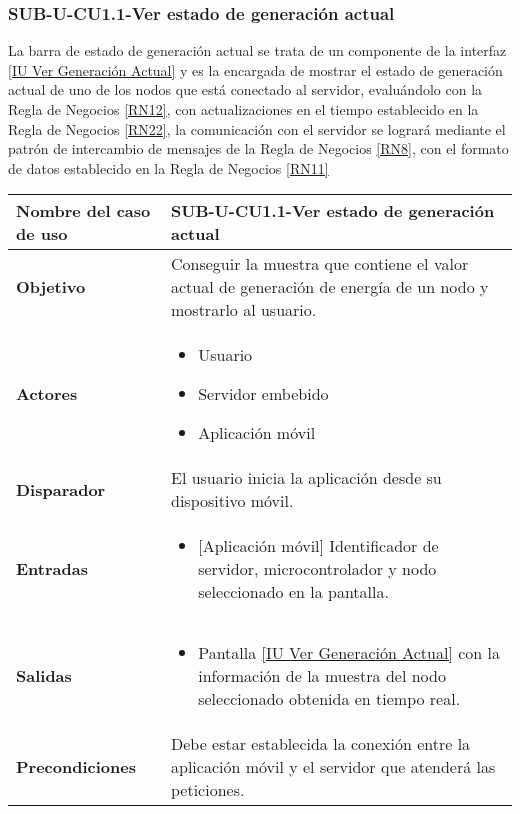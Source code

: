 \subsubsection{SUB-U-CU1.1-Ver estado de generación actual}\label{SUB-U-CU1.1}
La barra de estado de generación actual se trata de un componente de la interfaz \hyperref[fig:monitoreoReal]{[IU Ver Generación Actual]} y es la encargada de mostrar el estado de generación actual de uno de los nodos que está conectado al servidor, evaluándolo con la Regla de Negocios \ref{RN12}, con actualizaciones en el tiempo establecido en la Regla de Negocios \ref{RN22}, la comunicación con el servidor se logrará mediante el patrón de intercambio de mensajes de la Regla de Negocios \ref{RN8}, con el formato de datos establecido en la Regla de Negocios \ref{RN11}   
\begin{longtable}{|J{5cm}|J{10.3cm}|}
	\hline
	\textbf{Nombre del caso de uso} &
		SUB-U-CU1.1-Ver estado de generación actual \\ \hline
	\textbf{Objetivo} &
		Conseguir la muestra que contiene el valor actual de generación de energía de un nodo y mostrarlo al usuario. \\ \hline
	\textbf{Actores} &
		\begin{itemize}
		    \item Usuario
			\item Servidor embebido
			\item Aplicación móvil
		\end{itemize} \\ \hline
	\textbf{Disparador} & 
	    El usuario inicia la aplicación desde su dispositivo móvil.\\ \hline 
	\textbf{Entradas} & 
		\begin{itemize}
				\item{[Aplicación móvil]} Identificador de servidor, microcontrolador y nodo seleccionado en la pantalla.
		\end{itemize}\\ \hline 
	\textbf{Salidas} & 
		\begin{itemize}
			\item Pantalla \hyperref[fig:monitoreoReal]{[IU Ver Generación Actual]} con la información de la muestra del nodo seleccionado obtenida en tiempo real.
		\end{itemize} \\ \hline
	\textbf{Precondiciones} &
		Debe estar establecida la conexión entre la aplicación móvil y el servidor que atenderá las peticiones. \\ \hline

\end{longtable}
